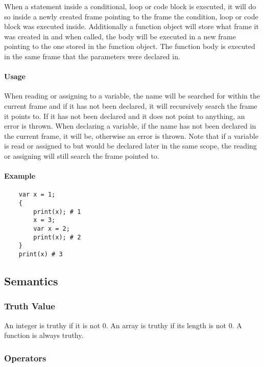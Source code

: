 When a statement inside a conditional, loop or code block is executed, it will do so inside a newly created frame pointing to the frame the condition, loop or code block was executed inside. Additionally a function object will store what frame it was created in and when called, the body will be executed in a new frame pointing to the one stored in the function object. The function body is executed in the same frame that the parameters were declared in.

\paragraph{Usage}

When reading or assigning to a variable, the name will be searched for within the current frame and if it has not been declared, it will recursively search the frame it points to. If it has not been declared and it does not point to anything, an error is thrown. When declaring a variable, if the name has not been declared in the current frame, it will be, otherwise an error is thrown. Note that if a variable is read or assigned to but would be declared later in the same scope, the reading or assigning will still search the frame pointed to.

\paragraph{Example}

\begin{verbatim}
    var x = 1;
    {
        print(x); # 1
        x = 3;
        var x = 2;
        print(x); # 2
    }
    print(x) # 3
\end{verbatim}

\subsection{Semantics}

\subsubsection{Truth Value}

An integer is truthy if it is not 0. An array is truthy if its length is not 0. A function is always truthy.

\subsubsection{Operators}

